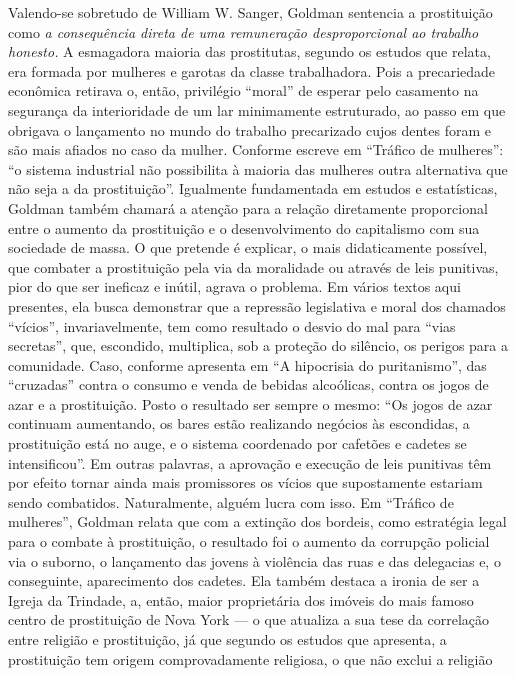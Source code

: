 Valendo-se sobretudo de William W. Sanger, Goldman sentencia a
prostituição como \emph{a consequência direta de uma remuneração
desproporcional ao trabalho honesto.} A esmagadora maioria das
prostitutas, segundo os estudos que relata, era formada por mulheres e
garotas da classe trabalhadora. Pois a precariedade econômica retirava
o, então, privilégio ``moral'' de esperar pelo casamento na segurança da
interioridade de um lar minimamente estruturado, ao passo em que
obrigava o lançamento no mundo do trabalho precarizado cujos dentes
foram e são mais afiados no caso da mulher. Conforme escreve em
``Tráfico de mulheres'': ``o sistema industrial não possibilita à
maioria das mulheres outra alternativa que não seja a da prostituição''.
Igualmente fundamentada em estudos e estatísticas, Goldman também
chamará a atenção para a relação diretamente proporcional entre o
aumento da prostituição e o desenvolvimento do capitalismo com sua
sociedade de massa. O que pretende é explicar, o mais didaticamente
possível, que combater a prostituição pela via da moralidade ou através
de leis punitivas, pior do que ser ineficaz e inútil, agrava o problema.
Em vários textos aqui presentes, ela busca demonstrar que a repressão
legislativa e moral dos chamados ``vícios'', invariavelmente, tem como
resultado o desvio do mal para ``vias secretas'', que, escondido,
multiplica, sob a proteção do silêncio, os perigos para a comunidade.
Caso, conforme apresenta em ``A hipocrisia do puritanismo'', das
``cruzadas'' contra o consumo e venda de bebidas alcoólicas, contra os
jogos de azar e a prostituição. Posto o resultado ser sempre o mesmo:
``Os jogos de azar continuam aumentando, os bares estão realizando
negócios às escondidas, a prostituição está no auge, e o sistema
coordenado por cafetões e cadetes se intensificou''. Em outras palavras,
a aprovação e execução de leis punitivas têm por efeito tornar ainda
mais promissores os vícios que supostamente estariam sendo combatidos.
Naturalmente, alguém lucra com isso. Em ``Tráfico de mulheres'', Goldman
relata que com a extinção dos bordeis, como estratégia legal para o
combate à prostituição, o resultado foi o aumento da corrupção policial
via o suborno, o lançamento das jovens à violência das ruas e das
delegacias e, o conseguinte, aparecimento dos cadetes. Ela também
destaca a ironia de ser a Igreja da Trindade, a, então, maior
proprietária dos imóveis do mais famoso centro de prostituição de Nova
York --- o que atualiza a sua tese da correlação entre religião e
prostituição, já que segundo os estudos que apresenta, a prostituição
tem origem comprovadamente religiosa, o que não exclui a religião
